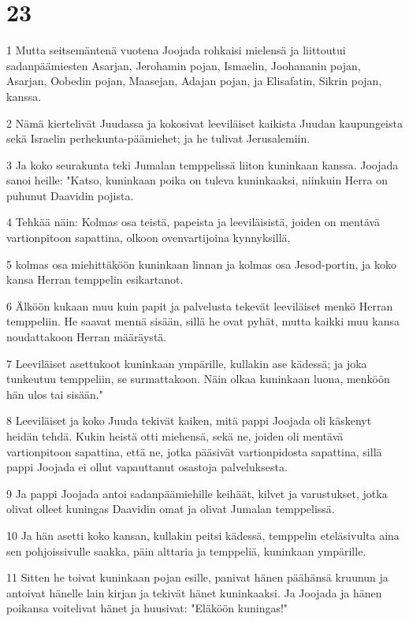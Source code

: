 \chapter{23}

\par 1 Mutta seitsemäntenä vuotena Joojada rohkaisi mielensä ja liittoutui sadanpäämiesten Asarjan, Jerohamin pojan, Ismaelin, Joohananin pojan, Asarjan, Oobedin pojan, Maasejan, Adajan pojan, ja Elisafatin, Sikrin pojan, kanssa.
\par 2 Nämä kiertelivät Juudassa ja kokosivat leeviläiset kaikista Juudan kaupungeista sekä Israelin perhekunta-päämiehet; ja he tulivat Jerusalemiin.
\par 3 Ja koko seurakunta teki Jumalan temppelissä liiton kuninkaan kanssa. Joojada sanoi heille: "Katso, kuninkaan poika on tuleva kuninkaaksi, niinkuin Herra on puhunut Daavidin pojista.
\par 4 Tehkää näin: Kolmas osa teistä, papeista ja leeviläisistä, joiden on mentävä vartionpitoon sapattina, olkoon ovenvartijoina kynnyksillä,
\par 5 kolmas osa miehittäköön kuninkaan linnan ja kolmas osa Jesod-portin, ja koko kansa Herran temppelin esikartanot.
\par 6 Älköön kukaan muu kuin papit ja palvelusta tekevät leeviläiset menkö Herran temppeliin. He saavat mennä sisään, sillä he ovat pyhät, mutta kaikki muu kansa noudattakoon Herran määräystä.
\par 7 Leeviläiset asettukoot kuninkaan ympärille, kullakin ase kädessä; ja joka tunkeutuu temppeliin, se surmattakoon. Näin olkaa kuninkaan luona, menköön hän ulos tai sisään."
\par 8 Leeviläiset ja koko Juuda tekivät kaiken, mitä pappi Joojada oli käskenyt heidän tehdä. Kukin heistä otti miehensä, sekä ne, joiden oli mentävä vartionpitoon sapattina, että ne, jotka pääsivät vartionpidosta sapattina, sillä pappi Joojada ei ollut vapauttanut osastoja palveluksesta.
\par 9 Ja pappi Joojada antoi sadanpäämiehille keihäät, kilvet ja varustukset, jotka olivat olleet kuningas Daavidin omat ja olivat Jumalan temppelissä.
\par 10 Ja hän asetti koko kansan, kullakin peitsi kädessä, temppelin eteläsivulta aina sen pohjoissivulle saakka, päin alttaria ja temppeliä, kuninkaan ympärille.
\par 11 Sitten he toivat kuninkaan pojan esille, panivat hänen päähänsä kruunun ja antoivat hänelle lain kirjan ja tekivät hänet kuninkaaksi. Ja Joojada ja hänen poikansa voitelivat hänet ja huusivat: "Eläköön kuningas!"
